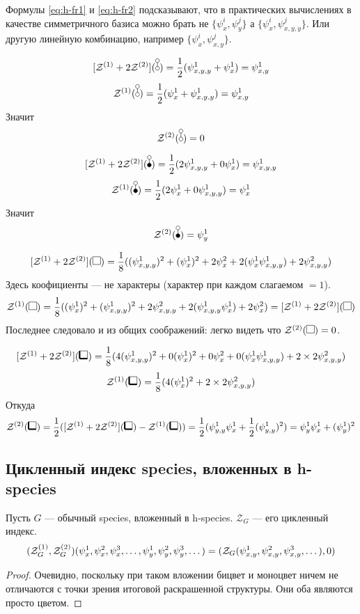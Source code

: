 \begin{remark}
Формулы \ref{eq:h-fr1} и \ref{eq:h-fr2} подсказывают, что в практических
вычислениях в качестве симметричного базиса можно брать не $\{\psi_x^i,
\psi_y^j\}$ а $\{\psi_x^i, \psi_{x,y,y}^j\}$. 
Или другую линейную комбинацию, например $\{\psi_x^i, \psi_{x,y}^j\}$.
\end{remark}

\begin{example}
$$
\Zfull(\dA) = \frac{1}{2}(\psi_{x,y,y}^1 + \psi_{x}^1) = \psi_{x,y}^1
$$
$$
\Zone(\dA) = \frac{1}{2}(\psi_{x}^1 + \psi_{x, y, y}^1) = \psi_{x,y}^1
$$
Значит
$$
\Ztwo(\dA) = 0
$$
\end{example}
\begin{example}
$$
\Zfull(\dB) = \frac{1}{2}(2\psi_{x,y,y}^1 + 0\psi_{x}^1) = \psi_{x,y,y}^1
$$
$$
\Zone(\dB) = \frac{1}{2}(2\psi_{x}^1 + 0\psi_{x, y, y}^1) = \psi_{x}^1
$$
Значит
$$
\Ztwo(\dB) = \psi_{y}^1
$$
\end{example}
\begin{example}
$$
\Zfull(\dAA) = \frac{1}{8}((\psi_{x,y,y}^1)^2 + (\psi_{x}^1)^2 + 2\psi_{x}^2 +
2(\psi_x^1\psi_{x,y,y}^1) + 2\psi_{x,y,y}^2)
$$
Здесь коофициенты --- не характеры (характер при каждом слагаемом $= 1$).
$$
\Zone(\dAA) = \frac{1}{8}((\psi_{x}^1)^2 + (\psi_{x, y, y}^1)^2 +
2\psi_{x, y, y}^2 + 2(\psi_{x, y, y}^1\psi_{x}^1) + 2\psi_{x}^2) = \Zfull(\dAA)
$$
Последнее следовало и из общих соображений: легко видеть что $\mathcal
Z^{(2)}(\dAA) = 0$.
\end{example}
\begin{example}
$$
\Zfull(\dBB) = \frac{1}{8}(4(\psi_{x,y,y}^1)^2 + 0(\psi_{x}^1)^2 + 0\psi_{x}^2
+ 0(\psi_x^1\psi_{x,y,y}^1) + 2\times2\psi_{x,y,y}^2)
$$
$$
\Zone(\dBB) = \frac{1}{8}(4(\psi_{x}^1)^2 + 2\times2\psi_{x,y,y}^2)
$$
Откуда
$$
\Ztwo(\dBB) = \frac{1}{2}(\Zfull(\dBB) - \mathcal
Z^{(1)}(\dBB)) = \frac{1}{2}(\psi_{y,y}^1\psi_{x}^1 +
\frac{1}{2}(\psi_{y, y}^1)^2) = \psi_{y}^1\psi_{x}^1 + (\psi_{y}^1)^2 $$
\end{example}

\subsection{Цикленный индекс species, вложенных в h-species}
\begin{statement}
\label{st:h-cl-for-sp}
Пусть $G$ --- обычный species, вложенный в h-species. $\mathcal Z_G$ --- его
цикленный индекс.
$$(\mathcal Z^{(1)}_G, \mathcal Z^{(2)}_G)
(\psi_x^1, \psi_x^2, \psi_x^3, \dots, 
\psi_y^1, \psi_y^2, \psi_y^3, \dots)
 = (\mathcal Z_G(\psi_{x,y}^1, \psi_{x,y}^2, \psi_{x,y}^3, \dots), 0)$$
\end{statement}
\begin{proof}
Очевидно, поскольку при таком вложении бицвет и моноцвет ничем не отличаются с
точки зрения итоговой раскрашенной структуры. Они оба являются просто цветом.
\end{proof}

